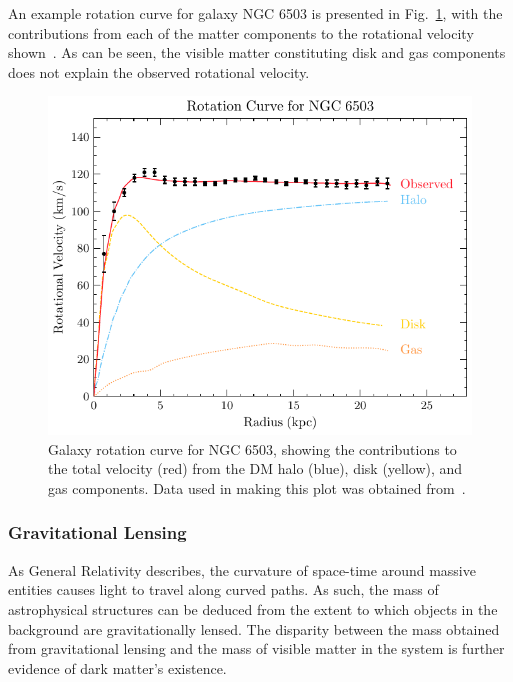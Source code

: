 An example rotation curve for galaxy NGC 6503 is presented in Fig.~\ref{fig:gal_rotn_curve}, with the contributions from each of the matter components to the rotational velocity shown~\cite{Freese:2008cz_may_ReviewObservationalEvidence, Lelli:2016zqa_SPARCMassModels}. As can be seen, the visible matter constituting disk and gas components does not explain the observed rotational velocity. 

\begin{figure}[t!]
    \centering
    \includegraphics{gal_rotn_N6503}
    \caption{Galaxy rotation curve for NGC 6503, showing the contributions to the total velocity (red) from the DM halo (blue), disk (yellow), and gas components. Data used in making this plot was obtained from~\cite{Freese:2008cz_may_ReviewObservationalEvidence, Lelli:2016zqa_SPARCMassModels}.}
    \label{fig:gal_rotn_curve}
\end{figure}

\subsubsection*{Gravitational Lensing}

As General Relativity describes, the curvature of space-time around massive entities causes light to travel along curved paths. As such, the mass of astrophysical structures can be deduced from the extent to which objects in the background are gravitationally lensed. The disparity between the mass obtained from gravitational lensing and the mass of visible matter in the system is further evidence of dark matter's existence. 

